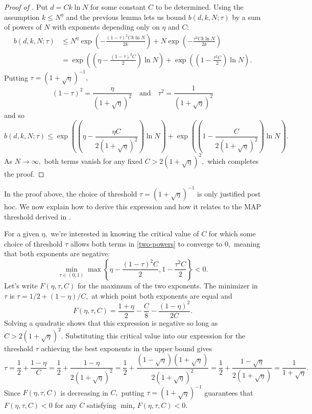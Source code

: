 \begin{proof}[Proof of ]
Put $d = C k \ln N$ for some constant $C$ to be determined. Using the assumption $k \le N^\eta$ and the previous lemma lets us bound $b(d, k, N; \tau)$ by a sum of powers of $N$ with exponents depending only on $\eta$ and $C$:
\begin{align}
b(d, k, N; \tau) &\le N^\eta \exp\left(- \frac{(1 - \tau)^2 C k \ln N}{2k} \right) + N \exp\left(- \frac{\tau^2 C k \ln N}{2k} \right)\nonumber\\
&= \exp\left(\left(\eta - \frac{(1-\tau)^2 C}{2}\right) \ln N\right) + \exp\left(\left(1 - \frac{\tau^2 C}{2}\right) \ln N\right).\label{two-powers}
\end{align}
Putting $\tau = (1 + \sqrt{\eta})^{-1},$
$$
(1 - \tau)^2 = \frac{\eta}{(1 + \sqrt{\eta})^2} \quad \text{and} \quad \tau^2 = \frac{1}{(1 + \sqrt{\eta})^2}
$$
and so
$$
b(d, k, N; \tau) \le \exp\left(\left(\eta - \frac{\eta C}{2(1 + \sqrt{\eta})^2}\right) \ln N\right) + \exp\left(\left(1 - \frac{C}{2(1 + \sqrt{\eta})^2}\right) \ln N\right).
$$
As $N \to \infty,$ both terms vanish for any fixed $C > 2(1 + \sqrt{\eta})^2,$ which completes the proof.
\end{proof}

In the proof above, the choice of threshold $\tau = (1 + \sqrt{\eta})^{-1}$ is only justified post hoc. We now explain how to derive this expression and how it relates to the MAP threshold derived in .

For a given $\eta,$ we're interested in knowing the critical value of $C$ for which some choice of threshold $\tau$ allows both terms in \eqref{two-powers} to converge to $0,$ meaning that both exponents are negative:
$$
\min_{\tau \in (0, 1)} \max \left\{ \eta - \frac{(1 - \tau)^2 C}{2}, 1 - \frac{\tau^2 C} 2 \right\} < 0.
$$
Let's write $F(\eta, \tau, C)$ for the maximum of the two exponents. The minimizer in $\tau$ is $\tau = 1/2 + (1-\eta)/C,$ at which point both exponents are equal and
$$
F(\eta, \tau, C) = \frac{1+\eta}{2} - \frac{C}{8} - \frac{(1-\eta)^2}{2C}.
$$
Solving a quadratic shows that this expression is negative so long as $C > 2(1 + \sqrt{\eta})^2.$ Substituting this critical value into our expression for the threshold $\tau$ achieving the best exponents in the upper bound gives
$$
\tau = \frac{1}{2} + \frac{1-\eta}{C} = \frac{1}{2} + \frac{1-\eta}{2(1 + \sqrt{\eta})^2} = \frac{1}{2} + \frac{(1-\sqrt{\eta})(1+\sqrt{\eta})}{2(1 + \sqrt{\eta})^2} = \frac{1}{2} + \frac{1-\sqrt{\eta}}{2(1 + \sqrt{\eta})} = \frac{1}{1 + \sqrt{\eta}}.
$$
Since $F(\eta, \tau, C)$ is decreasing in $C,$ putting $\tau = (1 + \sqrt \eta)^{-1}$ guarantees that $F(\eta, \tau, C) < 0$ for any $C$ satisfying $\min_\tau F(\eta, \tau, C) < 0.$

